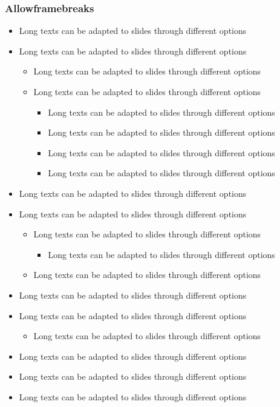\documentclass[usepdftitle=false,professionalfonts,compress ]{beamer}
\begin{document}
{
\begin{frame}[allowframebreaks]\frametitle{Allowframebreaks}
	\begin{itemize}

		\item Long texts can be adapted to slides through different options
		\item Long texts can be adapted to slides through different options
		\begin{itemize}

			\item Long texts can be adapted to slides through different options
			\item Long texts can be adapted to slides through different options
			\begin{itemize}

				\item Long texts can be adapted to slides through different options
				\item Long texts can be adapted to slides through different options
				\item Long texts can be adapted to slides through different options
				\item Long texts can be adapted to slides through different options
			\end{itemize}
		\end{itemize}
		\item Long texts can be adapted to slides through different options
		\item Long texts can be adapted to slides through different options
		\begin{itemize}

			\item Long texts can be adapted to slides through different options
			\begin{itemize}

				\item Long texts can be adapted to slides through different options
			\end{itemize}
			\item Long texts can be adapted to slides through different options
		\end{itemize}
		\item Long texts can be adapted to slides through different options
		\item Long texts can be adapted to slides through different options
		\begin{itemize}

			\item Long texts can be adapted to slides through different options
		\end{itemize}
		\item Long texts can be adapted to slides through different options
		\item Long texts can be adapted to slides through different options
		\item Long texts can be adapted to slides through different options
		\begin{itemize}


\end{itemize}
\end{itemize}
\end{frame}}
\end{document}
